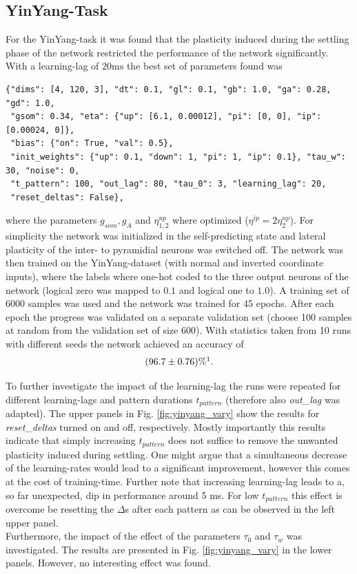 \documentclass[12pt,a4paper]{article}
\begin{document}
\subsection{YinYang-Task}
For the YinYang-task it was found that the plasticity induced during the settling phase of the network restricted the performance of the network significantly. With a learning-lag of $20\text{ms}$ the best set of parameters found was 
\begin{verbatim}
{"dims": [4, 120, 3], "dt": 0.1, "gl": 0.1, "gb": 1.0, "ga": 0.28, "gd": 1.0,
 "gsom": 0.34, "eta": {"up": [6.1, 0.00012], "pi": [0, 0], "ip": [0.00024, 0]},
 "bias": {"on": True, "val": 0.5},
 "init_weights": {"up": 0.1, "down": 1, "pi": 1, "ip": 0.1}, "tau_w": 30, "noise": 0,
 "t_pattern": 100, "out_lag": 80, "tau_0": 3, "learning_lag": 20,
 "reset_deltas": False},
\end{verbatim}
where the parameters $g_{som}, g_A$ and $\eta^{up}_{1,2}$ where optimized ($\eta^{ip} = 2\eta^{up}_2$). For simplicity the network was initialized in the self-predicting state and lateral plasticity of the inter- to pyramidial neurons was switched off. The network was then trained on the YinYang-dataset (with normal and inverted coordinate inputs), where the labels where one-hot coded to the three output neurons of the network (logical zero was mapped to $0.1$ and logical one to $1.0$). A training set of 6000 samples was used and the network was trained for 45 epochs. After each epoch the progress was validated on a separate validation set (choose 100 samples at random from the validation set of size 600). With statistics taken from 10 runs with different seeds the network achieved an accuracy of
\begin{align*}
(96.7 \pm 0.76)\% \protect\footnotemark.
\end{align*}

To further investigate the impact of the learning-lag the runs were repeated for different learning-lags and pattern durations $t_{pattern}$ (therefore also \textit{out\_lag} was adapted). 
The upper panels in Fig. \ref{fig:yinyang_vary} show the results for \textit{reset\_deltas} turned on and off, respectively. Mostly importantly this results indicate that simply increasing $t_{pattern}$ does not suffice to remove the unwanted plasticity induced during settling. One might argue that a simultaneous decrease of the learning-rates would lead to a significant improvement, however this comes at the cost of training-time. Further note that increasing learning-lag leads to a, so far unexpected, dip in performance around 5 ms. For low $t_{pattern}$ this effect is overcome be resetting the $\Delta$s after each pattern as can be observed in the left upper panel.\\
Furthermore, the impact of the effect of the parameters $\tau_0$ and $\tau_w$ was investigated. The results are presented in Fig. \ref{fig:yinyang_vary} in the lower panels. However, no interesting effect was found.
\end{document}
